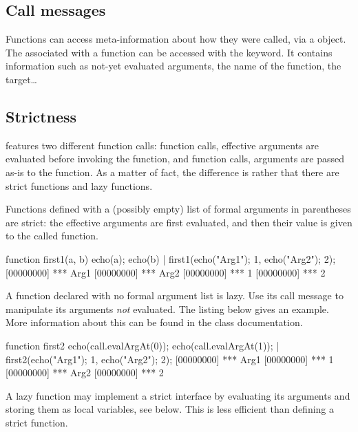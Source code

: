 \subsection{Call messages}
\label{sec:lang:call}

Functions can access meta-information about how they were called, via a
 object. The  associated with a
function can be accessed with the  keyword.  It contains
information such as not-yet evaluated arguments, the name of the function,
the target\ldots

\subsection{Strictness}

\us features two different function calls: 
function calls, effective arguments are evaluated before invoking the
function, and  function calls, arguments are passed
as-is to the function.  As a matter of fact, the difference is rather that
there are strict functions and lazy functions.

Functions defined with a (possibly empty) list of formal arguments in
parentheses are strict: the effective arguments are first evaluated,
and then their value is given to the called function.

\begin{urbiscript}
function first1(a, b) {
  echo(a); echo(b)
}|
first1({echo("Arg1"); 1},
       {echo("Arg2"); 2});
[00000000] *** Arg1
[00000000] *** Arg2
[00000000] *** 1
[00000000] *** 2
\end{urbiscript}

A function declared with no formal argument list is lazy.  Use its call
message to manipulate its arguments \emph{not} evaluated.  The listing below
gives an example.  More information about this can be found in the
 class documentation.

\begin{urbiscript}
function first2
{
  echo(call.evalArgAt(0));
  echo(call.evalArgAt(1));
}|
first2({echo("Arg1"); 1},
       {echo("Arg2"); 2});
[00000000] *** Arg1
[00000000] *** 1
[00000000] *** Arg2
[00000000] *** 2
\end{urbiscript}

A lazy function may implement a strict interface by evaluating its
arguments and storing them as local variables, see below.  This is
less efficient than defining a strict function.

